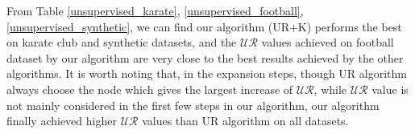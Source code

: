 \documentclass[\main/thesis.tex]{subfiles}
\begin{document}


From Table \ref{unsupervised_karate}, \ref{unsupervised_football}, \ref{unsupervised_synthetic}, we can find our algorithm (UR+K) performs the best on karate club and synthetic datasets, and the $\mathcal{UR}$ values achieved on football dataset by our algorithm are very close to the best results achieved by the  other algorithms. It is worth noting that, in the expansion steps, though UR algorithm always choose the node which gives the largest increase of $\mathcal{UR}$, while $\mathcal{UR}$ value is not mainly considered in the first few steps in our algorithm, our algorithm finally achieved higher $\mathcal{UR}$ values than UR algorithm on all datasets.
\end{document}
